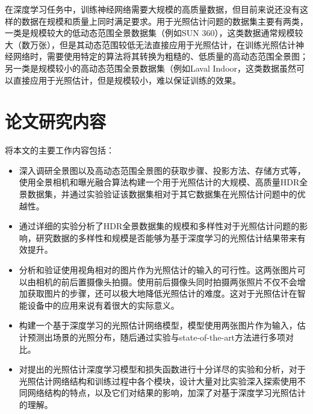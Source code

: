 在深度学习任务中，训练神经网络需要大规模的高质量数据，但目前来说还没有这样的数据在规模和质量上同时满足要求。用于光照估计问题的数据集主要有两类，一类是规模较大的低动态范围全景数据集（例如SUN 360\cite{xiao2012recognizing}），这类数据通常规模较大（数万张），但是其动态范围较低无法直接应用于光照估计，在训练光照估计神经网络时，需要使用特定的算法将其转换为粗糙的、低质量的高动态范围全景图；另一类是规模较小的高动态范围全景数据集（例如Laval Indoor\cite{gardner2017learning}，这类数据虽然可以直接应用于光照估计，但是规模较小，难以保证训练的效果。

\section{论文研究内容}
将本文的主要工作内容包括：
\begin{itemize}
    \item 深入调研全景图以及高动态范围全景图的获取步骤、投影方法、存储方式等，使用全景相机和曝光融合算法构建一个用于光照估计的大规模、高质量HDR全景数据集，并通过实验验证该数据集相对于其它数据集在光照估计问题中的优越性。
    \item 通过详细的实验分析了HDR全景数据集的规模和多样性对于光照估计问题的影响，研究数据的多样性和规模是否能够为基于深度学习的光照估计结果带来有效提升。
    \item 分析和验证使用视角相对的图片作为光照估计的输入的可行性。这两张图片可以由相机的前后置摄像头拍摄。使用前后摄像头同时拍摄两张照片不仅不会增加获取图片的步骤，还可以极大地降低光照估计的难度。这对于光照估计在智能设备中的应用来说有着很大的实际意义。
    \item 构建一个基于深度学习的光照估计网络模型，模型使用两张图片作为输入，估计预测出场景的光照分布，随后通过实验与state-of-the-art方法进行多项对比。
    \item 对提出的光照估计深度学习模型和损失函数进行十分详尽的实验和分析，对于光照估计网络结构和训练过程中各个模块，设计大量对比实验深入探索使用不同网络结构的特点，以及它们对结果的影响，加深了对基于深度学习光照估计的理解。
\end{itemize}